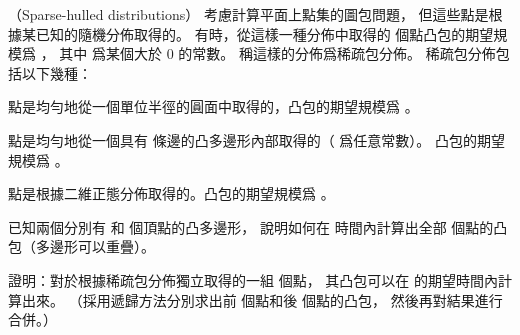 \startPROBLEM
（Sparse-hulled distributions）
考慮計算平面上點集的圖包問題，
但這些點是根據某已知的隨機分佈取得的。
有時，從這樣一種分佈中取得的  個點凸包的期望規模爲 ，
其中 \m{\varepsilon} 爲某個大於 0 的常數。
稱這樣的分佈爲{\EMP 稀疏包分佈}。
稀疏包分佈包括以下幾種：
\startigBase[2]
\item 點是均勻地從一個單位半徑的圓面中取得的，凸包的期望規模爲 。
\item 點是均勻地從一個具有  條邊的凸多邊形內部取得的（ 爲任意常數）。
凸包的期望規模爲 。
\item 點是根據二維正態分佈取得的。凸包的期望規模爲 。
\stopigBase

\startigBase[a]\startitem
已知兩個分別有  和  個頂點的凸多邊形，
說明如何在  時間內計算出全部  個點的凸包（多邊形可以重疊）。
\stopitem\stopigBase

\startANSWER
{}
\stopANSWER

\startigBase[continue]\startitem
證明：對於根據稀疏包分佈獨立取得的一組  個點，
其凸包可以在  的期望時間內計算出來。
（\hint 採用遞歸方法分別求出前  個點和後  個點的凸包，
然後再對結果進行合併。）
\stopitem\stopigBase

\startANSWER
{}
\stopANSWER
\stopPROBLEM

\stopsubject%
